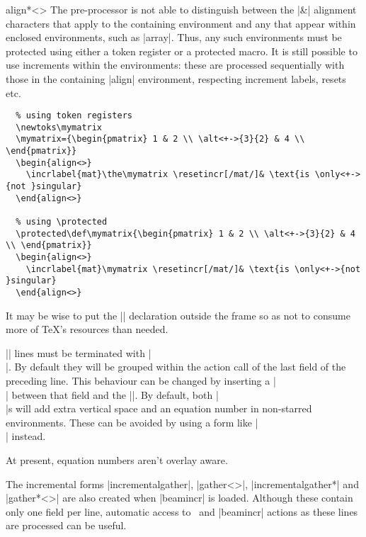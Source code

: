 \documentclass[a4paper]{ltxdoc}
\begin{document}
\begin{environment}{{align*<>}}
    The pre-processor is not able to distinguish between the |&| alignment
    characters that apply to the containing environment and any that appear
    within enclosed environments, such as |array|.  Thus, any such environments
    must be protected using either a token register or a protected macro.  It is
    still possible to use increments within the environments: these are
    processed sequentially with those in the containing |align| environment,
    respecting increment labels, resets etc.

    \example
\begin{verbatim}
  % using token registers
  \newtoks\mymatrix
  \mymatrix={\begin{pmatrix} 1 & 2 \\ \alt<+->{3}{2} & 4 \\ \end{pmatrix}}
  \begin{align<>}
    \incrlabel{mat}\the\mymatrix \resetincr[/mat/]& \text{is \only<+->{not }singular}
  \end{align<>}

  % using \protected
  \protected\def\mymatrix{\begin{pmatrix} 1 & 2 \\ \alt<+->{3}{2} & 4 \\ \end{pmatrix}}
  \begin{align<>}
    \incrlabel{mat}\mymatrix \resetincr[/mat/]& \text{is \only<+->{not }singular}
  \end{align<>}

\end{verbatim}
    It may be wise to put the |\newtoks| declaration outside the frame so as not
    to consume more of \TeX's resources than needed.  

    |\intertext| lines must be terminated with |\\|.  By default they will be
    grouped within the action call of the last field of the preceding line.
    This behaviour can be changed by inserting a |\\| between that field and the
    |\intertext|.  By default, both |\\|s will add extra vertical space and an
    equation number in non-starred environments.  These can be avoided by using
    a form like |\nonumber\\[-3ex]| instead.

    At present, equation numbers aren't overlay aware.
\end{environment}
%
The incremental forms |incrementalgather|, |gather<>|, |incrementalgather*| and
|gather*<>| are also created when |beamincr| is loaded.  Although these contain
only one field per line, automatic access to \beamer\ and |beamincr| actions as
these lines are processed can be useful.
\end{document}
